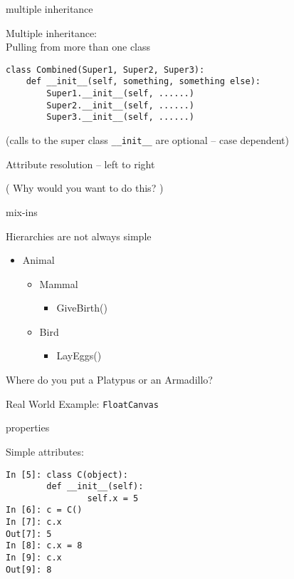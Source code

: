 \documentclass{beamer}
\begin{document}
\begin{frame}[fragile]{multiple inheritance}

{\Large Multiple inheritance:\\
\hspace{0.2in} Pulling from more than one class}

\vfill
\begin{verbatim}
class Combined(Super1, Super2, Super3):
    def __init__(self, something, something else):
        Super1.__init__(self, ......)        
        Super2.__init__(self, ......)        
        Super3.__init__(self, ......)        
\end{verbatim}
(calls to the super class \verb|__init__| are optional -- case dependent)

\vfill
{\Large Attribute resolution -- left to right}

\vfill
( Why would you want to do this? )

\end{frame} 

\begin{frame}[fragile]{mix-ins}

\vfill
{\Large Hierarchies are not always simple}
\vfill
\begin{itemize}
  \item Animal
  \begin{itemize}
    \item Mammal
    \begin{itemize}
      \item GiveBirth()
    \end{itemize}
    \item Bird
    \begin{itemize}
      \item LayEggs()
    \end{itemize}
  \end{itemize}
\end{itemize}
\vfill
{\Large Where do you put a Platypus or an Armadillo?}

\vfill
{\Large Real World Example: \verb|FloatCanvas|}
\end{frame} 

\begin{frame}[fragile]{properties}

{\Large Simple attributes:}

\begin{verbatim}
In [5]: class C(object):
        def __init__(self):
                self.x = 5
In [6]: c = C()
In [7]: c.x
Out[7]: 5
In [8]: c.x = 8
In [9]: c.x
Out[9]: 8
\end{verbatim}

\end{frame} 
\end{document}
